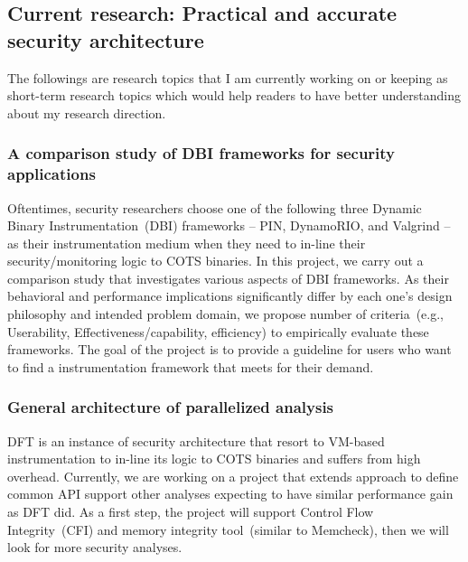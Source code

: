 \documentclass[letterpaper, 10pt]{article}
\begin{document}
\begin{small}
\subsection*{Current research: Practical and accurate security architecture}
%
%
The followings are research topics that I am currently working on or keeping as
short-term research topics which would help readers to have better
understanding about my research direction.

\subsubsection*{A comparison study of DBI frameworks for security applications}
%
Oftentimes, security researchers choose one of the following three Dynamic
Binary Instrumentation~(DBI) frameworks -- PIN, DynamoRIO, and Valgrind -- as
their instrumentation medium when they need to in-line their
security/monitoring logic to COTS binaries.
%
In this project, we carry out a comparison study that investigates various
aspects of DBI frameworks. As their behavioral and performance implications
significantly differ by each one's design philosophy and intended problem
domain, we propose number of criteria~(e.g., Userability,
Effectiveness/capability, efficiency) to empirically evaluate these frameworks.
%
The goal of the project is to provide a guideline for users who want to find a
instrumentation framework that meets for their demand.

\subsubsection*{General architecture of parallelized analysis} 
%
DFT is an instance of security architecture that resort to VM-based
instrumentation to in-line its logic to COTS binaries and suffers from high
overhead.
%
Currently, we are working on a project that extends \SR approach to define
common API support other analyses expecting to have similar performance gain as
DFT did. 
%
As a first step, the project will support Control Flow Integrity~(CFI) and
memory integrity tool~(similar to Memcheck), then we will look for more
security analyses.


\end{small}
\end{document}
